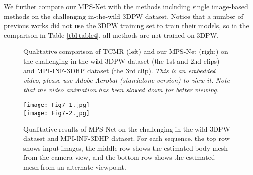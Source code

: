 \documentclass[10pt,twocolumn,letterpaper]{article}
\begin{document}
 We further compare our MPS-Net with the methods including single image-based methods on the challenging in-the-wild 3DPW dataset. Notice that a number of previous works \cite{hmrKanazawa17,Kolotouros2019ConvolutionalMR,Kolotouros2019LearningTR,pymaf2021,Moon_2020_ECCV_I2L-MeshNet,Kanazawa2019Learning3H,Doersch2019Sim2realTL,Yu2019HumanMR,Kocabas2020VIBEVI,choi2020beyond} did not use the 3DPW training set to train their models, so in the comparison in Table \ref{tbl:table4}, all methods are not trained on 3DPW.\vspace{-2pt}

\begin{figure}[t]
  \centering
{}\vspace{-8pt}
  \caption{Qualitative comparison of TCMR \cite{choi2020beyond} (left) and our MPS-Net (right) on the challenging in-the-wild 3DPW \cite{Marcard2018RecoveringA3} dataset (the 1st and 2nd clips) and MPI-INF-3DHP \cite{Mehta2017Monocular3H} dataset (the 3rd clip). \textit{This is an embedded video, please use Adobe Acrobat (standalone version) to view it. Note that the video animation has been slowed down for better viewing.}}\vspace{-2pt}
  \label{fig:fig6}
\end{figure}

\iffalse
\begin{figure}[t]
  \centering
  \texttt{[image: Fig6.png]}\vspace{-8pt}
  \caption{Qualitative comparison of TCMR \cite{choi2020beyond} (left) and our MPS-Net (right) on the challenging in-the-wild 3DPW \cite{Marcard2018RecoveringA3} dataset (the 1st and 2nd clips) and MPI-INF-3DHP \cite{Mehta2017Monocular3H} dataset (the 3rd clip). \textit{This is an embedded video, please refer to our arxiv paper to view the video.}}\vspace{-2pt}
  \label{fig:fig6}
\end{figure}
\fi

\begin{figure}
  \centering
  \texttt{[image: Fig7-1.jpg]}\\
  \texttt{[image: Fig7-2.jpg]}\vspace{-8pt}
  \caption{Qualitative results of MPS-Net on the challenging in-the-wild 3DPW \cite{Marcard2018RecoveringA3} dataset and MPI-INF-3DHP \cite{Mehta2017Monocular3H} dataset. For each sequence, the top row shows input images, the middle row shows the estimated body mesh from the camera view, and the bottom row shows the estimated mesh from an alternate viewpoint.}\vspace{-12pt}
  \label{fig:fig7}
\end{figure}
\end{document}
